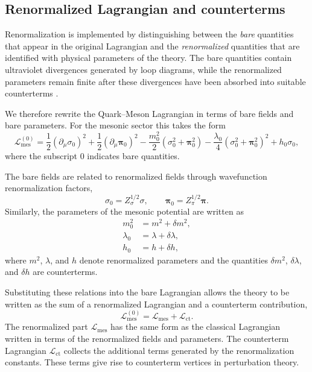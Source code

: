 \subsection{Renormalized Lagrangian and counterterms}

Renormalization is implemented by distinguishing between the
\emph{bare} quantities that appear in the original Lagrangian and the
\emph{renormalized} quantities that are identified with physical
parameters of the theory. The bare quantities contain ultraviolet
divergences generated by loop diagrams, while the renormalized
parameters remain finite after these divergences have been absorbed
into suitable counterterms \cite{PeskinSchroeder1995,WeinbergQFT}.

We therefore rewrite the Quark--Meson Lagrangian in terms of bare
fields and bare parameters. For the mesonic sector this takes the
form
\begin{equation}
\mathcal{L}_{\mathrm{mes}}^{(0)}
=
\frac{1}{2}(\partial_\mu \sigma_0)^2
+
\frac{1}{2}(\partial_\mu \boldsymbol{\pi}_0)^2
-
\frac{m_0^2}{2}(\sigma_0^2+\boldsymbol{\pi}_0^2)
-
\frac{\lambda_0}{4}(\sigma_0^2+\boldsymbol{\pi}_0^2)^2
+
h_0 \sigma_0 ,
\end{equation}
where the subscript $0$ indicates bare quantities.

The bare fields are related to renormalized fields through
wavefunction renormalization factors,
\begin{equation}
\sigma_0 = Z_\sigma^{1/2}\sigma,
\qquad
\boldsymbol{\pi}_0 = Z_\pi^{1/2}\boldsymbol{\pi}.
\end{equation}
Similarly, the parameters of the mesonic potential are written as
\begin{align}
m_0^2 &= m^2 + \delta m^2, \\
\lambda_0 &= \lambda + \delta \lambda, \\
h_0 &= h + \delta h ,
\end{align}
where $m^2$, $\lambda$, and $h$ denote renormalized parameters and the
quantities $\delta m^2$, $\delta\lambda$, and $\delta h$ are
counterterms.

Substituting these relations into the bare Lagrangian allows the
theory to be written as the sum of a renormalized Lagrangian and a
counterterm contribution,
\begin{equation}
\mathcal{L}_{\mathrm{mes}}^{(0)}
=
\mathcal{L}_{\mathrm{mes}}
+
\mathcal{L}_{\mathrm{ct}} .
\end{equation}
The renormalized part $\mathcal{L}_{\mathrm{mes}}$ has the same form
as the classical Lagrangian written in terms of the renormalized
fields and parameters. The counterterm Lagrangian
$\mathcal{L}_{\mathrm{ct}}$ collects the additional terms generated by
the renormalization constants. These terms give rise to
counterterm vertices in perturbation theory.


